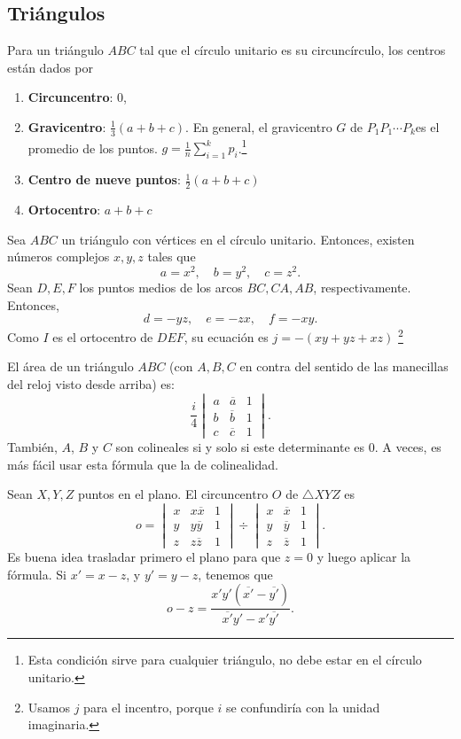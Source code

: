 \documentclass[11pt]{scrartcl}
\begin{document}
\subsection{Triángulos}
Para un triángulo $ABC$ tal que el círculo unitario es su circuncírculo, los centros están dados por
\begin{enumerate}
    \item \textbf{Circuncentro}: 0,
    \item \textbf{Gravicentro}: $\frac{1}{3} (a+b+c)$. En general, el gravicentro $G$ de $P_1P_1 \cdots P_k$es el promedio de los puntos. $g=\frac 1n \sum_{i=1}^k p_i$.\footnote{Esta condición sirve para cualquier triángulo, no debe estar en el círculo unitario.}
    \item \textbf{Centro de nueve puntos}: $\frac{1}{2}  (a+b+c)$
    \item \textbf{Ortocentro}: $a+b+c$
\end{enumerate}

\begin{lemma}[Incentro]
Sea $ABC$ un triángulo con vértices en el círculo unitario. Entonces, existen números complejos $x,y,z$ tales que 
\[a = x^2,\quad b = y^2,\quad c = z^2.\]
Sean $D, E, F$ los puntos medios de los arcos  $BC, CA, AB$, respectivamente. Entonces, 
\[d = -yz,\quad e = -zx,\quad f = -xy.\]
Como $I$ es el ortocentro de $DEF$, su ecuación es $j = -(xy+yz+xz)$ \footnote{Usamos $j$ para el incentro, porque $i$ se confundiría con la unidad imaginaria.}
\end{lemma}

\begin{lemma}
El área de un triángulo $ABC$ (con $A,B,C$ en contra del sentido de las manecillas del reloj visto desde arriba) es: 
\[ \frac{i}{4} \begin{vmatrix}a & \overline{a} & 1\\ b & \overline{b} & 1\\ c & \overline{c} & 1\end{vmatrix}.\]
También, $A$, $B$ y $C$ son colineales si y solo si este determinante es 0. A veces, es más fácil usar esta fórmula que la de colinealidad.
\end{lemma}

\begin{lemma}[Circuncentro]
Sean $X, Y, Z$ puntos en el plano. El circuncentro $O$ de $\bigtriangleup XYZ$ es
\[o = \begin{vmatrix}x & x\overline x & 1\\ y & y\overline y & 1\\ z & z\overline z & 1\end{vmatrix}\div\begin{vmatrix}x &\overline x & 1\\y & \overline y & 1\\ z & \overline z & 1\end{vmatrix}.\]
Es buena idea trasladar primero el plano para que $z=0$ y luego aplicar la fórmula. Si $x' = x-z$, y $y' = y-z$, tenemos que 
\[o -z = \frac{x'y'(\overline{x'}-\overline{y'})}{\overline{x'}y'-x'\overline{y'}}.\] 
\end{lemma}
\end{document}
